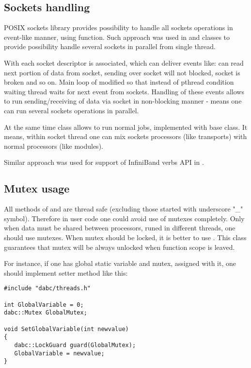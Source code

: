 \subsection{Sockets handling}

POSIX sockets library provides possibility to handle all sockets operations in 
event-like manner, using  function. Such approach was used in  
 and  classes to provide
possibility handle several sockets in parallel from single thread.

With each  socket descriptor is associated, which can
deliver events like: can read next portion of data from socket, 
sending over socket will not blocked, socket is broken and so on.
Main loop of  modified so that instead of pthread condition waiting 
thread waits for next event from sockets.
Handling of these events allows to run sending/receiving of data via socket 
in non-blocking manner - means one can run several sockets operations in parallel.  

At the same time  class allows to run normal jobs,
implemented with base  class. 
It means, within socket thread one can mix sockets processors (like transports) 
with normal processors (like modules).  

Similar approach was used for support of InfiniBand verbs API in \dabc. 


\subsection{Mutex usage}

All methods of  and  are thread
safe (excluding those started with underscore "\_" symbol). Therefore in
user code one could avoid use of mutexes completely. Only when data must be shared between
processors, runed in different threads, one should use mutexes. When mutex should be locked,
it is better to use . This class guarantees that mutex will be always unlocked
when function scope is leaved. 

For instance, if one has global static variable and mutex, assigned with it,
one should implement setter method like this:
\begin{small}
\begin{verbatim}
#include "dabc/threads.h"

int GlobalVariable = 0;
dabc::Mutex GlobalMutex;

void SetGlobalVariable(int newvalue) 
{
   dabc::LockGuard guard(GlobalMutex);
   GlobalVariable = newvalue;
}
\end{verbatim}     
\end{small}



